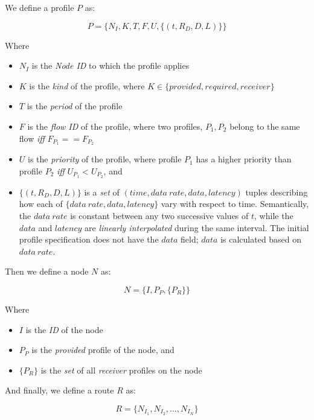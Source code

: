 We define a profile $P$ as:

\begin{equation}
  P = \{N_I,K,T,F,U,\{(t,R_D,D,L)\}\}
\end{equation}

Where

\begin{itemize}
\item $N_I$ is the \emph{Node ID} to which the profile applies
\item $K$ is the \emph{kind} of the profile, where
  $K\in\{provided,required,receiver\}$
\item $T$ is the \emph{period} of the profile
\item $F$ is the \emph{flow ID} of the profile, where two profiles,
  $P_1,P_2$ belong to the same flow \emph{iff}
  $F_{P_1}==F_{P_2}$
\item $U$ is the \emph{priority} of the profile, where profile
  $P_1$ has a higher priority than profile $P_2$ \emph{iff}
  $U_{P_1} < U_{P_2}$, and
\item $\{(t,R_D,D,L)\}$ is a \emph{set} of $(time, data\ rate,
  data, latency)$ tuples describing how each of $\{data\ rate,
  data, latency\}$ vary with respect to time.  Semantically, the
  $data\ rate$ is constant between any two successive values of
  $t$, while the $data$ and $latency$ are \emph{linearly
  interpolated} during the same interval.  The initial profile
  specification does not have the $data$ field; $data$ is
  calculated based on $data\ rate$.
\end{itemize}

Then we define a node $N$ as:

\begin{equation}
  N = \{I,P_P,\{P_R\}\}
\end{equation}

Where 

\begin{itemize}
\item $I$ is the \emph{ID} of the node
\item $P_P$ is the \emph{provided} profile of the node, and
\item $\{P_R\}$ is the \emph{set} of all \emph{receiver} profiles on the node
\end{itemize}

And finally, we define a route $R$ as:

\begin{equation}
  R = \{N_{I_1},N_{I_2},...,N_{I_N}\}
\end{equation}

